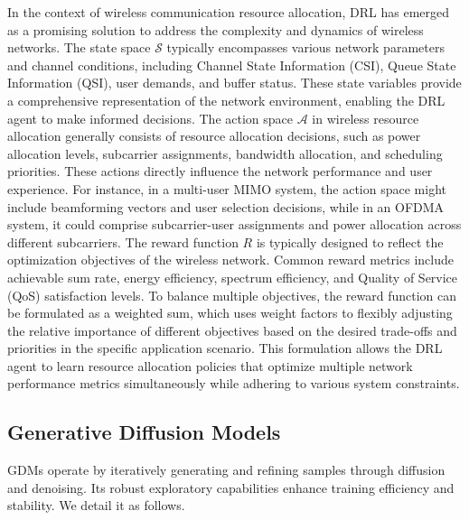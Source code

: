 \documentclass[comsoc,journal]{IEEEtran}
\begin{document}
In the context of wireless communication resource allocation, DRL has emerged as a promising solution to address the complexity and dynamics of wireless networks. The state space $\mathcal{S}$ typically encompasses various network parameters and channel conditions, including Channel State Information (CSI)\cite{zhang2022drl}, Queue State Information (QSI)\cite{hao2022delay}, user demands\cite{kasi2022d}, and buffer status\cite{swistak2024qos}. These state variables provide a comprehensive representation of the network environment, enabling the DRL agent to make informed decisions.
The action space $\mathcal{A}$ in wireless resource allocation generally consists of resource allocation decisions, such as power allocation levels, subcarrier assignments, bandwidth allocation, and scheduling priorities. These actions directly influence the network performance and user experience. For instance, in a multi-user MIMO system, the action space might include beamforming vectors and user selection decisions\cite{al2022self}, while in an OFDMA system, it could comprise subcarrier-user assignments and power allocation across different subcarriers\cite{he2023reinforcement}.
The reward function $R$ is typically designed to reflect the optimization objectives of the wireless network. Common reward metrics include achievable sum rate, energy efficiency, spectrum efficiency, and Quality of Service (QoS) satisfaction levels\cite{zhi2022deep}. To balance multiple objectives, the reward function can be formulated as a weighted sum, which uses weight factors to flexibly adjusting the relative importance of different objectives based on the desired trade-offs and priorities in the specific application scenario\cite{chai2024drl}. This formulation allows the DRL agent to learn resource allocation policies that optimize multiple network performance metrics simultaneously while adhering to various system constraints.
\vspace{-8pt}
\subsection{Generative Diffusion Models}
GDMs operate by iteratively generating and refining samples through diffusion and denoising. Its robust exploratory capabilities enhance training efficiency and stability. We detail it as follows.
\end{document}
